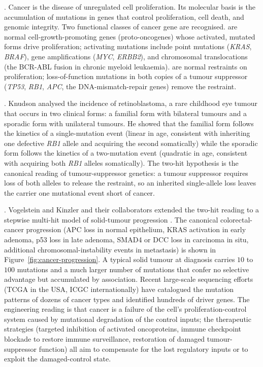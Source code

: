 . Cancer is the
disease of unregulated cell proliferation. Its molecular basis is the
accumulation of mutations in genes that control proliferation, cell
death, and genomic integrity. Two functional classes of cancer gene
are recognised.  are normal cell-growth-promoting
genes (proto-oncogenes) whose activated, mutated forms drive
proliferation; activating mutations include point mutations
(\emph{KRAS}, \emph{BRAF}), gene amplifications (\emph{MYC},
\emph{ERBB2}), and chromosomal translocations (the BCR-ABL fusion in
chronic myeloid leukaemia).  are
normal restraints on proliferation; loss-of-function mutations in
both copies of a tumour suppressor (\emph{TP53}, \emph{RB1},
\emph{APC}, the DNA-mismatch-repair genes) remove the restraint.

. Knudson \cite{paper:v6c03-knudson-1971}
analysed the incidence of retinoblastoma, a rare childhood eye tumour
that occurs in two clinical forms: a familial form with bilateral
tumours and a sporadic form with unilateral tumours. He showed that
the familial form follows the kinetics of a single-mutation event
(linear in age, consistent with inheriting one defective \emph{RB1}
allele and acquiring the second somatically) while the sporadic form
follows the kinetics of a two-mutation event (quadratic in age,
consistent with acquiring both \emph{RB1} alleles somatically). The
two-hit hypothesis is the canonical reading of tumour-suppressor
genetics: a tumour suppressor requires loss of both alleles to
release the restraint, so an inherited single-allele loss leaves the
carrier one mutational event short of cancer.

. Vogelstein and Kinzler and
their collaborators extended the two-hit reading to a stepwise
multi-hit model of solid-tumour progression
\cite{paper:v6c03-fearon-vogelstein-1990, paper:v6c03-vogelstein-kinzler-2013}.
The canonical colorectal-cancer progression (APC loss in normal
epithelium, KRAS activation in early adenoma, p53 loss in late
adenoma, SMAD4 or DCC loss in carcinoma in situ, additional
chromosomal-instability events in metastasis) is shown in
Figure~\ref{fig:cancer-progression}. A typical solid tumour at
diagnosis carries $10$ to $100$  mutations and a
much larger number of  mutations that confer no
selective advantage but accumulated by association. Recent large-scale
sequencing efforts (TCGA in the USA, ICGC internationally) have
catalogued the mutation patterns of dozens of cancer types and
identified hundreds of driver genes. The engineering reading is that
cancer is a failure of the cell's proliferation-control system caused
by mutational degradation of the control inputs; the therapeutic
strategies (targeted inhibition of activated oncoproteins, immune
checkpoint blockade to restore immune surveillance, restoration of
damaged tumour-suppressor function) all aim to compensate for the
lost regulatory inputs or to exploit the damaged-control state.

